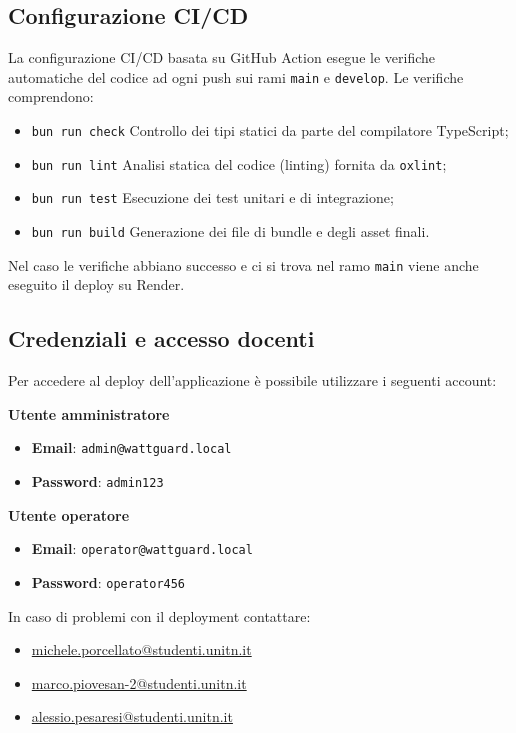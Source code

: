 \subsection{Configurazione CI/CD}
La configurazione CI/CD basata su GitHub Action esegue le verifiche automatiche del codice ad ogni push sui rami \texttt{main} e \texttt{develop}.
Le verifiche comprendono:
\begin{itemize}
    \item \texttt{bun run check} Controllo dei tipi statici da parte del compilatore TypeScript;
    \item \texttt{bun run lint} Analisi statica del codice (linting) fornita da \texttt{oxlint};
    \item \texttt{bun run test} Esecuzione dei test unitari e di integrazione;
    \item  \texttt{bun run build} Generazione dei file di bundle e degli asset finali.
\end{itemize}
Nel caso le verifiche abbiano successo e ci si trova nel ramo \texttt{main} viene anche eseguito il deploy su Render.

\subsection{Credenziali e accesso docenti}
Per accedere al deploy dell'applicazione è possibile utilizzare i seguenti account:
\begin{center}
\textbf{Utente amministratore}
    \begin{itemize}
        \item \textbf{Email}: \texttt{admin@wattguard.local}
        \item \textbf{Password}: \texttt{admin123}
    \end{itemize}
\textbf{Utente operatore}
    \begin{itemize}
        \item \textbf{Email}: \texttt{operator@wattguard.local}
        \item \textbf{Password}: \texttt{operator456}
    \end{itemize}
\end{center}
\vspace{1cm}
In caso di problemi con il deployment contattare:
\begin{itemize}
    \item \href{mailto:michele.porcellato@studenti.unitn.it}{michele.porcellato@studenti.unitn.it}
    \item \href{mailto:marco.piovesan-2@studenti.unitn.it}{marco.piovesan-2@studenti.unitn.it}
    \item \href{mailto:alessio.pesaresi@studenti.unitn.it}{alessio.pesaresi@studenti.unitn.it}
\end{itemize}